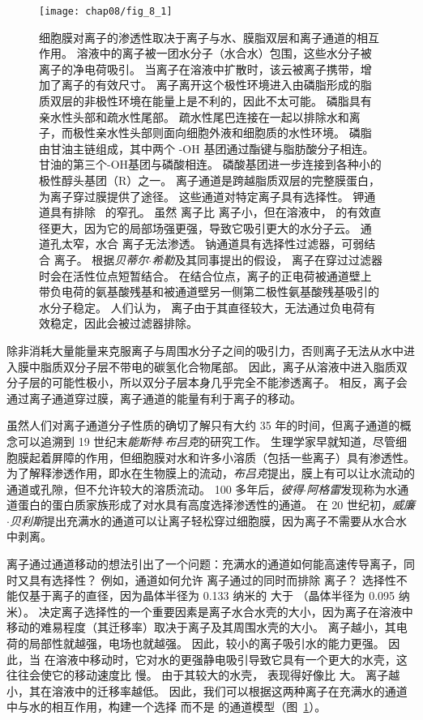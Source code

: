 \begin{figure}[htbp]
	\centering
	\texttt{[image: chap08/fig\_8\_1]}
	\caption{细胞膜对离子的渗透性取决于离子与水、膜脂双层和离子通道的相互作用。
		溶液中的离子被一团水分子（水合水）包围，这些水分子被离子的净电荷吸引。
		当离子在溶液中扩散时，该云被离子携带，增加了离子的有效尺寸。
		离子离开这个极性环境进入由磷脂形成的脂质双层的非极性环境在能量上是不利的，因此不太可能。
		磷脂具有亲水性头部和疏水性尾部。
		疏水性尾巴连接在一起以排除水和离子，而极性亲水性头部则面向细胞外液和细胞质的水性环境。
		磷脂由甘油主链组成，其中两个 -OH 基团通过酯键与脂肪酸分子相连。
		甘油的第三个-OH基团与磷酸相连。
		磷酸基团进一步连接到各种小的极性醇头基团（R）之一。
		离子通道是跨越脂质双层的完整膜蛋白，为离子穿过膜提供了途径。
		这些通道对特定离子具有选择性。
		钾通道具有排除~ 的窄孔。
		虽然  离子比  离子小，但在溶液中， 的有效直径更大，因为它的局部场强更强，导致它吸引更大的水分子云。
		 通道孔太窄，水合  离子无法渗透。
		钠通道具有选择性过滤器，可弱结合  离子。
		根据\textit{贝蒂尔$\cdot$希勒}及其同事提出的假设， 离子在穿过过滤器时会在活性位点短暂结合。
		在结合位点，离子的正电荷被通道壁上带负电荷的氨基酸残基和被通道壁另一侧第二极性氨基酸残基吸引的水分子稳定。
		人们认为， 离子由于其直径较大，无法通过负电荷有效稳定，因此会被过滤器排除。}
	\label{fig:8_1}
\end{figure}


除非消耗大量能量来克服离子与周围水分子之间的吸引力，否则离子无法从水中进入膜中脂质双分子层不带电的碳氢化合物尾部。
因此，离子从溶液中进入脂质双分子层的可能性极小，所以双分子层本身几乎完全不能渗透离子。
相反，离子会通过离子通道穿过膜，离子通道的能量有利于离子的移动。


虽然人们对离子通道分子性质的确切了解只有大约 35 年的时间，但离子通道的概念可以追溯到 19 世纪末\textit{能斯特$\cdot$布吕克}的研究工作。
生理学家早就知道，尽管细胞膜起着屏障的作用，但细胞膜对水和许多小溶质（包括一些离子）具有渗透性。
为了解释渗透作用，即水在生物膜上的流动，\textit{布吕克}提出，膜上有可以让水流动的通道或孔隙，但不允许较大的溶质流动。
100 多年后，\textit{彼得$\cdot$阿格雷}发现称为水通道蛋白的蛋白质家族形成了对水具有高度选择渗透性的通道。
在 20 世纪初，\textit{威廉$\cdot$贝利斯}提出充满水的通道可以让离子轻松穿过细胞膜，因为离子不需要从水合水中剥离。


离子通过通道移动的想法引出了一个问题：充满水的通道如何能高速传导离子，同时又具有选择性？
例如，通道如何允许  离子通过的同时而排除  离子？
选择性不能仅基于离子的直径，因为晶体半径为 0.133 纳米的  大于 （晶体半径为 0.095 纳米）。
决定离子选择性的一个重要因素是离子水合水壳的大小，因为离子在溶液中移动的难易程度（其迁移率）取决于离子及其周围水壳的大小。
离子越小，其电荷的局部性就越强，电场也就越强。
因此，较小的离子吸引水的能力更强。
因此，当  在溶液中移动时，它对水的更强静电吸引导致它具有一个更大的水壳，这往往会使它的移动速度比  慢。
由于其较大的水壳， 表现得好像比  大。
离子越小，其在溶液中的迁移率越低。
因此，我们可以根据这两种离子在充满水的通道中与水的相互作用，构建一个选择  而不是   的通道模型（图~\ref{fig:8_1}）。


